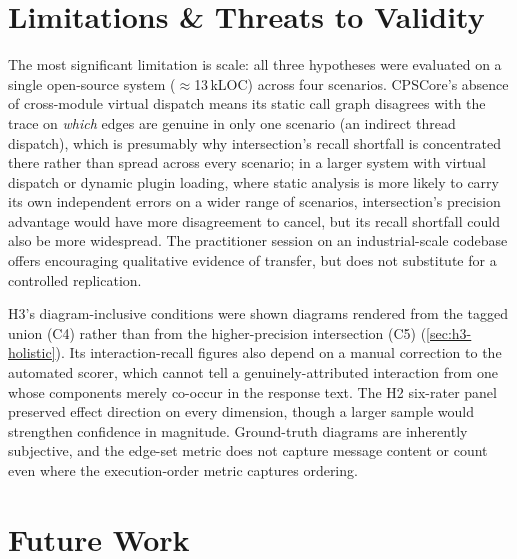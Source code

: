 \section{Limitations \& Threats to Validity}

The most significant limitation is scale: all three hypotheses were
evaluated on a single open-source system ($\approx$13\,kLOC) across four
scenarios. CPSCore's absence of cross-module virtual dispatch means its
static call graph disagrees with the trace on \emph{which} edges are
genuine in only one scenario (an indirect thread dispatch), which is
presumably why intersection's recall shortfall is concentrated there
rather than spread across every scenario; in a larger system with
virtual dispatch or dynamic plugin loading, where static analysis is
more likely to carry its own independent errors on a wider range of
scenarios, intersection's precision advantage would have more
disagreement to cancel, but its recall shortfall could also be more
widespread. The practitioner session on an industrial-scale codebase
offers encouraging qualitative evidence of transfer, but does not
substitute for a controlled replication.

H3's diagram-inclusive conditions were shown diagrams rendered from the
tagged union (C4) rather than from the higher-precision intersection
(C5) (\cref{sec:h3-holistic}). Its interaction-recall figures also
depend on a manual correction to the automated scorer, which cannot
tell a genuinely-attributed interaction from one whose components merely
co-occur in the response text. The H2 six-rater panel preserved effect direction on
every dimension, though a larger sample would strengthen confidence in
magnitude. Ground-truth diagrams are inherently subjective, and the
edge-set metric does not capture message content or count even where
the execution-order metric captures ordering.

\section{Future Work}\label{sec:future-work}

